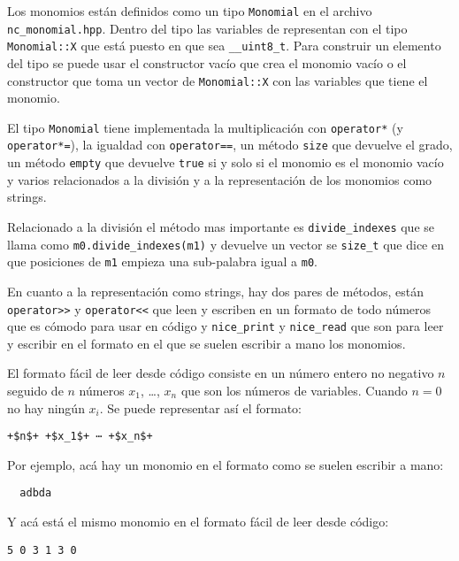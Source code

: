 \documentclass{report}
\theoremstyle{customstyle}
\theoremstyle{factstyle}
\begin{document}
Los monomios están definidos como un tipo \texttt{Monomial} en el archivo \texttt{nc\_monomial.hpp}. Dentro del tipo las variables de representan con el tipo \texttt{Monomial::X} que está puesto en que sea \texttt{\_\_uint8\_t}. Para construir un elemento del tipo se puede usar el constructor vacío que crea el monomio vacío o el constructor que toma un vector de \texttt{Monomial::X} con las variables que tiene el monomio.

El tipo \texttt{Monomial} tiene implementada la multiplicación con \texttt{operator*} (y \texttt{operator*=}), la igualdad con \texttt{operator==}, un método \texttt{size} que devuelve el grado, un método \texttt{empty} que devuelve \texttt{true} si y solo si el monomio es el monomio vacío y varios relacionados a la división y a la representación de los monomios como strings.

Relacionado a la división el método mas importante es \texttt{divide\_indexes} que se llama como \texttt{m0.divide\_indexes(m1)} y devuelve un vector se \texttt{size\_t} que dice en que posiciones de \texttt{m1} empieza una sub-palabra igual a \texttt{m0}.

En cuanto a la representación como strings, hay dos pares de métodos, están \texttt{operator>>} y \texttt{operator<<} que leen y escriben en un formato de todo números que es cómodo para usar en código y \texttt{nice\_print} y \texttt{nice\_read} que son para leer y escribir en el formato en el que se suelen escribir a mano los monomios.

El formato fácil de leer desde código consiste en un número entero no negativo $n$ seguido de $n$ números $x_1$, …, $x_n$ que son los números de variables. Cuando $n = 0$ no hay ningún $x_i$. Se puede representar así el formato:

\begin{lstlisting}[escapechar=+]
  +$n$+ +$x_1$+ ⋯ +$x_n$+
\end{lstlisting}

Por ejemplo, acá hay un monomio en el formato como se suelen escribir a mano:

\begin{lstlisting}
  adbda
\end{lstlisting}

Y acá está el mismo monomio en el formato fácil de leer desde código:

\begin{lstlisting}[escapechar=+]
  5 0 3 1 3 0
\end{lstlisting}
\end{document}
